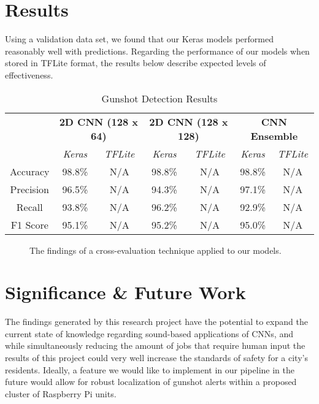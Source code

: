\documentclass[conference]{IEEEtran}
\begin{document}
\section{Results}

Using a validation data set, we found that our Keras models performed reasonably well with predictions. Regarding the performance of our models when stored in TFLite format, the results below describe expected levels of effectiveness.

\begin{table}[htbp]
\caption{Gunshot Detection Results}
\begin{center}
\begin{tabular}{|c|c|c|c|c|c|c|}
\hline
& \multicolumn{2}{|c|}{\textbf{2D CNN (128 x 64)}} & \multicolumn{2}{|c|}{\textbf{2D CNN (128 x 128)}} & \multicolumn{2}{|c|}{\textbf{CNN Ensemble}} \\
\cline{2-7}
& \textit{Keras} & \textit{TFLite} & \textit{Keras} & \textit{TFLite} & \textit{Keras} & \textit{TFLite} \\
\hline
Accuracy & 98.8\% & N/A & 98.8\% & N/A & 98.8\% & N/A  \\
\hline
Precision & 96.5\% & N/A & 94.3\% & N/A & 97.1\% & N/A \\
\hline
Recall & 93.8\% & N/A & 96.2\% & N/A & 92.9\% & N/A \\
\hline
F1 Score & 95.1\% & N/A & 95.2\% & N/A & 95.0\% & N/A \\
\hline
\end{tabular}
\label{tab2}
\end{center}
\end{table}

\begin{figure}[htbp]
\caption{The findings of a cross-evaluation technique applied to our models.}
\label{fig2}
\end{figure}

\section{Significance \& Future Work}

The findings generated by this research project have the potential to expand the current state of knowledge regarding sound-based applications of CNNs, and while simultaneously reducing the amount of jobs that require human input the results of this project could very well increase the standards of safety for a city’s residents. Ideally, a feature we would like to implement in our pipeline in the future would allow for robust localization of gunshot alerts within a proposed cluster of Raspberry Pi units.
\end{document}
